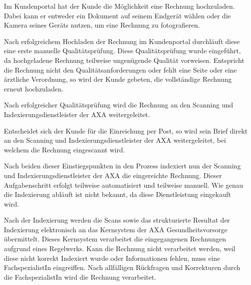 
Im Kundenportal hat der Kunde die Möglichkeit eine Rechnung hochzuladen. Dabei kann er entweder ein Dokument auf seinem Endgerät wählen oder die Kamera seines Geräts nutzen, um eine Rechnung zu fotografieren.

Nach erfolgreichem Hochladen der Rechnung im Kundenportal durchläuft diese eine erste manuelle Qualitätsprüfung. Diese Qualitätsprüfung wurde eingeführt, da hochgeladene Rechnung teilweise ungenügende Qualität vorweisen. Entspricht die Rechnung nicht den Qualitätsanforderungen oder fehlt eine Seite oder eine ärztliche Verordnung, so wird der Kunde gebeten, die vollständige Rechnung erneut hochzuladen.

Nach erfolgreicher Qualitätsprüfung wird die Rechnung an den Scanning und Indexierungsdienstleister der AXA weitergeleitet.

Entscheidet sich der Kunde für die Einreichung per Post, so wird sein Brief direkt an den Scanning und Indexierungsdienstleister der AXA weitergeleitet, bei welchem die Rechnung eingescannt wird.

Nach beiden dieser Einstiegspunkten in den Prozess indexiert nun der Scanning und Indexierungsdienstleister der AXA die eingereichte Rechnung. Dieser Aufgabenschritt erfolgt teilweise automatisiert und teilweise manuell. Wie genau die Indexierung abläuft ist nicht bekannt, da diese Dienstleistung eingekauft wird.

Nach der Indexierung werden die Scans sowie das strukturierte Resultat der Indexierung elektronisch an das Kernsystem der AXA Gesundheitsvorsorge übermittelt. Dieses Kernsystem verarbeitet die eingegangenen Rechnungen aufgrund eines Regelwerks. Kann die Rechnung nicht verarbeitet werden, weil diese nicht korrekt Indexiert wurde oder Informationen fehlen, muss eine FachspezialistIn eingreiffen. Nach allfälligen Rückfragen und Korrekturen durch die FachspezialistIn wird die Rechnung verarbeitet. 

